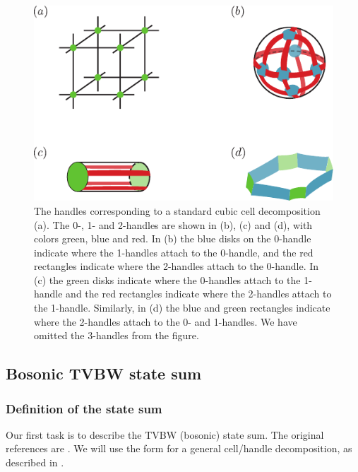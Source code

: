 \begin{figure}
\begin{center}
\includegraphics[scale = 1]{HandleDecompFig.pdf}
\end{center}
\caption{\label{HandleDecompFig}%
The handles corresponding to a standard cubic cell decomposition (a).
The 0-, 1- and 2-handles are shown in (b), (c) and (d), with colors green, blue and red.
In (b) the blue disks on the 0-handle indicate where the 1-handles attach to the 0-handle, and the red rectangles
indicate where the 2-handles attach to the 0-handle.
In (c) the green disks indicate where the 0-handles attach to the 1-handle and the red rectangles indicate where the 2-handles attach to the 1-handle.
Similarly, in (d) the blue and green rectangles indicate where the 2-handles attach to the 0- and 1-handles.
We have omitted the 3-handles from the figure.}
\end{figure} 


\subsection{Bosonic TVBW state sum}


\subsubsection{Definition of the state sum}

Our first task is to describe the TVBW (bosonic) state sum.
The original references are \cite{Turaev1992,Barrett1996}.
We will use the form for a general cell/handle decomposition, as described in \cite{Walker2006}.

